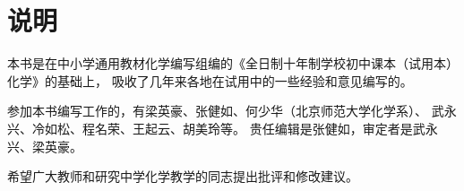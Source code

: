\chapter{说明}

本书是在中小学通用教材化学编写组编的《全日制十年制学校初中课本（试用本）化学》的基础上，
吸收了几年来各地在试用中的一些经验和意见编写的。


参加本书编写工作的，有梁英豪、张健如、何少华（北京师范大学化学系）、
武永兴、冷如松、程名荣、王起云、胡美玲等。
贵任编辑是张健如，审定者是武永兴、梁英豪。

希望广大教师和研究中学化学教学的同志提出批评和修改建议。


